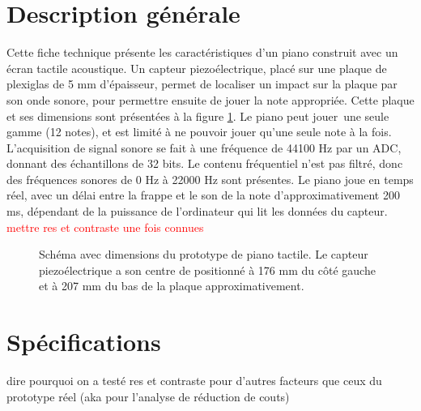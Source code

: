 \documentclass[11pt,letterpaper]{article}
\begin{document}

\section{Description générale}




Cette fiche technique présente les caractéristiques d'un piano construit avec un
écran tactile acoustique. Un capteur piezoélectrique, placé sur une plaque de
plexiglas de 5 mm d'épaisseur, permet de localiser un impact sur la plaque par 
son onde sonore, pour permettre ensuite de jouer la note appropriée. Cette plaque 
et ses dimensions sont présentées à la figure \ref{piano_fig}. Le piano peut jouer\
une seule gamme (12 notes), et est limité à ne pouvoir jouer qu'une seule note à 
la fois. L'acquisition de signal sonore se fait à une fréquence de 44100 Hz par un
ADC, donnant des échantillons de 32 bits. Le contenu fréquentiel n'est pas filtré,
donc des fréquences sonores de 0 Hz à 22000 Hz sont présentes. Le piano joue en temps
réel, avec un délai entre la frappe et le son de la note d'approximativement 200 ms,
dépendant de la puissance de l'ordinateur qui lit les données du capteur. \textcolor{red}{mettre res et contraste une fois connues}

\begin{figure}[H]
  \centering
  
  \caption{Schéma avec dimensions du prototype de piano tactile. Le capteur
  piezoélectrique a son centre de positionné à 176 mm du côté gauche et à 207 mm
  du bas de la plaque approximativement.}
  \label{piano_fig}
\end{figure}



\section{Spécifications}

dire pourquoi on a testé res et contraste pour d'autres facteurs que ceux du prototype réel (aka pour l'analyse de réduction de couts)

\end{document}
